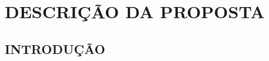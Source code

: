 
\chapter{DESCRIÇÃO DA PROPOSTA}
\label{chap:descricao}

\section{INTRODUÇÃO}
\label{sec:introducao}


